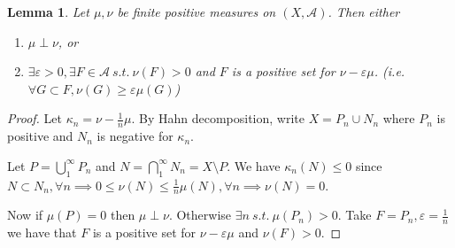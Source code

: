 \documentclass{report}
\newcommand{\st}{\ s.t.\ }
\newcommand{\cA}{\mathcal{A}}
\newtheorem{lemma}[theorem]{Lemma}
\theoremstyle{definition}
\theoremstyle{remark}
\begin{document}
\begin{lemma}
	Let $\mu, \nu$ be finite positive measures on $(X, \cA)$. Then either \begin{enumerate}
		\item $\mu \perp \nu$, or
		\item $\exists \varepsilon > 0, \exists F \in \cA \st \nu(F) > 0$ and $F$ is a positive set for $\nu - \varepsilon\mu$. (i.e. $\forall G \subset F, \nu(G) \geq \varepsilon \mu(G)$)
	\end{enumerate}
\end{lemma}
\begin{proof}
	Let $\kappa_n = \nu - \frac{1}{n}\mu$. By Hahn decomposition, write $X = P_n \cup N_n$ where $P_n$ is positive and $N_n$ is negative for $\kappa_n$.
	
	Let $P = \bigcup_1^\infty P_n$ and $N = \bigcap_1^\infty N_n = X \setminus P$.
	We have $\kappa_n(N) \leq 0$ since $N \subset N_n, \forall n \implies 0 \leq \nu(N) \leq \frac{1}{n}\mu(N), \forall n \implies \nu(N) = 0$.

	Now if $\mu(P) = 0$ then $\mu \perp \nu$. Otherwise $\exists n \st \mu(P_n) > 0$. Take $F = P_n, \varepsilon = \frac{1}{n}$ we have that $F$ is a positive set for $\nu - \varepsilon\mu$ and $\nu(F) > 0$.
\end{proof}
\end{document}
